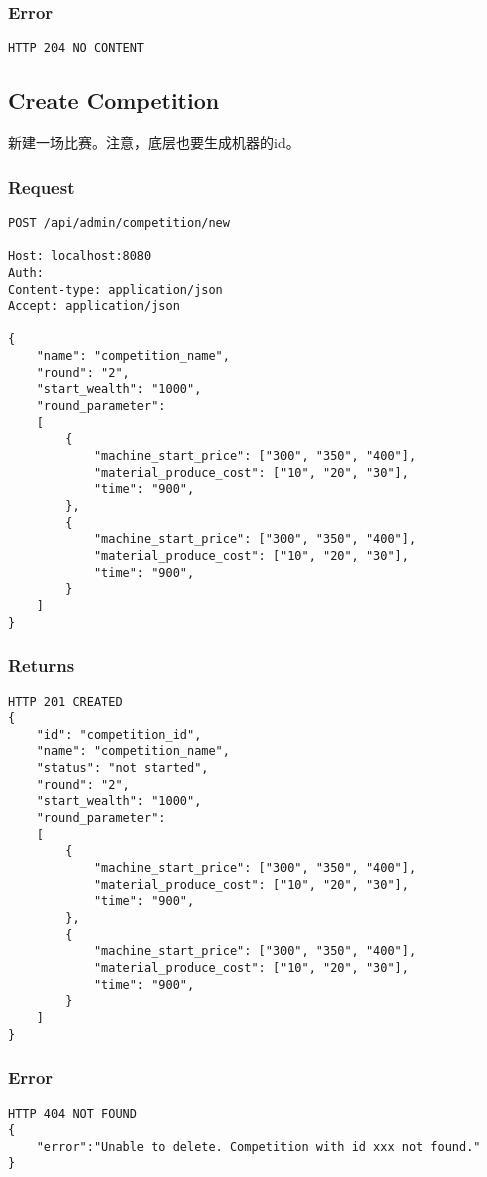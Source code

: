 \documentclass{article}
\begin{document}
\subsubsection*{Error}
\begin{lstlisting}
HTTP 204 NO CONTENT
\end{lstlisting}

\subsection{Create Competition}
新建一场比赛。注意，底层也要生成机器的id。

\subsubsection*{Request}
\begin{lstlisting}
POST /api/admin/competition/new

Host: localhost:8080
Auth:
Content-type: application/json
Accept: application/json

{
    "name": "competition_name",
    "round": "2",
    "start_wealth": "1000",
    "round_parameter":
    [
        {
            "machine_start_price": ["300", "350", "400"],
            "material_produce_cost": ["10", "20", "30"],
            "time": "900",
        },
        {
            "machine_start_price": ["300", "350", "400"],
            "material_produce_cost": ["10", "20", "30"],
            "time": "900",
        }
    ]
}
\end{lstlisting}

\subsubsection*{Returns}
\begin{lstlisting}
HTTP 201 CREATED
{
    "id": "competition_id",
    "name": "competition_name",
    "status": "not started",
    "round": "2",
    "start_wealth": "1000",
    "round_parameter":
    [
        {
            "machine_start_price": ["300", "350", "400"],
            "material_produce_cost": ["10", "20", "30"],
            "time": "900",
        },
        {
            "machine_start_price": ["300", "350", "400"],
            "material_produce_cost": ["10", "20", "30"],
            "time": "900",
        }
    ]
}

\end{lstlisting}

\subsubsection*{Error}
\begin{lstlisting}
HTTP 404 NOT FOUND
{
    "error":"Unable to delete. Competition with id xxx not found."
}
\end{lstlisting}
\end{document}
